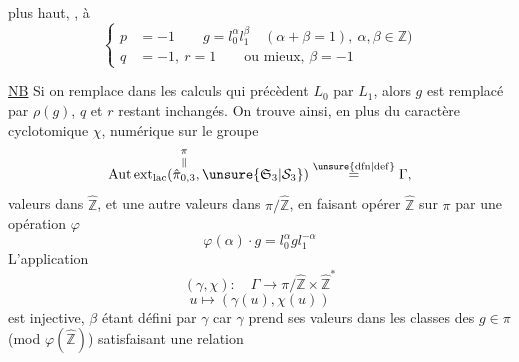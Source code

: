 plus haut,  ,   à
\[
\left\{\begin{aligned}
p&=-1\qquad g=l_0^\alpha l_1^\beta\quad(\alpha+\beta=1),\ \alpha,\beta\in\mathbb Z)\\
q&=-1,\ r=1\qquad\text{ou mieux, }\beta=-1
\end{aligned}\right.
\]

\uline{NB} Si on remplace dans les calculs qui précèdent $L_0$ par $L_1$, alors $g$ est remplacé par $\rho(g)$, $q$ et $r$ restant inchangés. On trouve ainsi, en plus du caractère cyclotomique $\chi$,    numérique \inserted{\uline{$\beta$},} sur le groupe
\[
\operatorname{Aut\,ext}_{\mathrm{lac}}(\overset{\pi}{\overset{\Vert}{\hat\pi_{0,3}}},\unsure{\mathfrak S_3|\mathcal S_3})\overset{\unsure{\mathrm{dfn}|\mathrm{def}}}=\Gamma,
\]
  valeurs dans $\hat{\mathbb Z}$, et une autre \inserted{$\gamma$}  valeurs dans $\pi/\hat{\mathbb Z}$, en faisant opérer $\hat{\mathbb Z}$ sur $\pi$ par une opération $\varphi$
\[
\varphi(\alpha)\cdot g=l_0^\alpha gl_1^{-\alpha}
\]
L'application
\[
(\gamma,\chi):\quad\Gamma\longrightarrow\pi/\hat{\mathbb Z}\times\hat{\mathbb Z}^{*}
\]
\[
u\longmapsto(\gamma(u),\chi(u))
\]
\margin{\uline{NB} \inserted{$\gamma_0:\mathcal E_0\longrightarrow\pi$} est un $1$. cocycle sur $\mathcal E_0\unsure{=|\simeq}\operatorname{Aut}_{\mathrm{lac}}(\pi,L_0)$, [\deleted{\unsure{groupe|fixant}} \inserted{qui définit} le ss-gr. des éléments qui commutent ext. à $\unsure{\mathfrak S_3|\mathcal S_3}$}
est injective,  $\beta$ étant défini par $\gamma$ car $\gamma$ prend ses valeurs dans les classes des $g\in\pi$ (mod $\varphi(\hat{\mathbb Z})$) satisfaisant une relation
